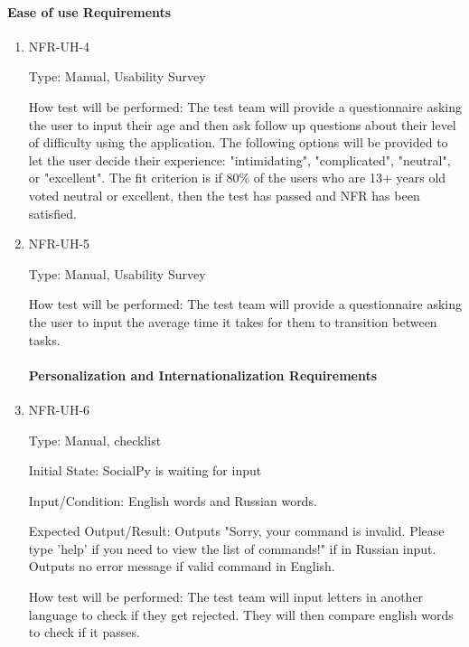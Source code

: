\documentclass[12pt, titlepage]{article}
\begin{document}
\paragraph{Ease of use Requirements}
\begin{enumerate}

\item{NFR-UH-4\\}

Type: Manual, Usability Survey
					
How test will be performed: The test team will provide a questionnaire asking the user to input their age and then ask follow up questions about their level of difficulty using the application. The following options will be provided to let the user decide their experience: "intimidating", "complicated", "neutral", or "excellent". The fit criterion is if 80\% of the users who are 13+ years old voted neutral or excellent, then the test has passed and NFR has been satisfied.

\item{NFR-UH-5\\}

Type: Manual, Usability Survey
					
How test will be performed: The test team will provide a questionnaire asking the user to input the average time it takes for them to transition between tasks.

\paragraph{Personalization and Internationalization Requirements}
\item{NFR-UH-6\\}

Type: Manual, checklist

Initial State: SocialPy is waiting for input
					
Input/Condition: English words and Russian words.
					
Expected Output/Result: Outputs "Sorry, your command is invalid. Please type 'help' if you need to view the list of commands!" if in Russian input. Outputs no error message if valid command in English.
					
How test will be performed: The test team will input letters in another language to check if they get rejected. They will then compare english words to check if it passes.

\end{enumerate}
\end{document}

